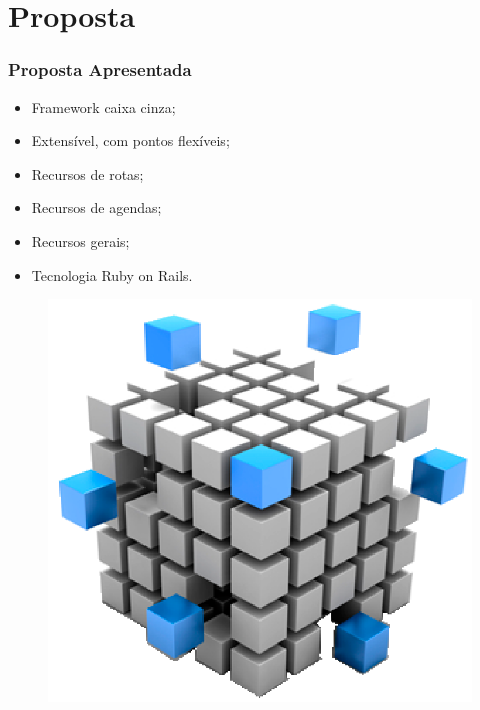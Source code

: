 \documentclass{beamer}
\begin{document}
\section{Proposta}

\begin{frame}
\frametitle{Proposta Apresentada}

\begin{itemize}
	\item Framework caixa cinza;
	\item Extensível, com pontos flexíveis;
	\item Recursos de rotas;
	\item Recursos de agendas;
	\item Recursos gerais;
	\item Tecnologia Ruby on Rails.
\end{itemize}

\begin{figure}[h]
	\centering
	\includegraphics[scale=0.35]{figuras/framework.eps}
\end{figure}

\end{frame}
\end{document}

